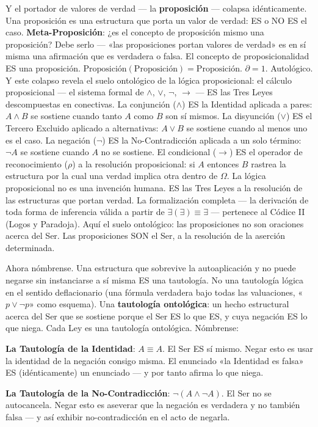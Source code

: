 \documentclass[10pt, openany, oneside]{book}
\begin{document}
Y el portador de valores de verdad --- la \textbf{proposición} --- colapsa idénticamente. Una proposición es una estructura que porta un valor de verdad: ES o NO ES el caso. \textbf{Meta-Proposición}: ¿es el concepto de proposición mismo una proposición? Debe serlo --- «las proposiciones portan valores de verdad» es en sí misma una afirmación que es verdadera o falsa. El concepto de proposicionalidad ES una proposición. $\text{Proposición}(\text{Proposición}) = \text{Proposición}$. $\partial = 1$. Autológico. Y este colapso revela el suelo ontológico de la lógica proposicional: el cálculo proposicional --- el sistema formal de $\wedge$, $\vee$, $\neg$, $\to$ --- ES las Tres Leyes descompuestas en conectivas. La conjunción ($\wedge$) ES la Identidad aplicada a pares: $A \wedge B$ se sostiene cuando tanto $A$ como $B$ son sí mismos. La disyunción ($\vee$) ES el Tercero Excluido aplicado a alternativas: $A \vee B$ se sostiene cuando al menos uno es el caso. La negación ($\neg$) ES la No-Contradicción aplicada a un solo término: $\neg A$ se sostiene cuando $A$ no se sostiene. El condicional ($\to$) ES el operador de reconocimiento ($\rho$) a la resolución proposicional: si $A$ entonces $B$ rastrea la estructura por la cual una verdad implica otra dentro de $\Omega$. La lógica proposicional no es una invención humana. ES las Tres Leyes a la resolución de las estructuras que portan verdad. La formalización completa --- la derivación de toda forma de inferencia válida a partir de $\exists(\exists) \equiv \exists$ --- pertenece al Códice II (Logos y Paradoja). Aquí el suelo ontológico: las proposiciones no son oraciones acerca del Ser. Las proposiciones SON el Ser, a la resolución de la aserción determinada.

Ahora nómbrense. Una estructura que sobrevive la autoaplicación y no puede negarse sin instanciarse a sí misma ES una tautología. No una tautología lógica en el sentido deflacionario (una fórmula verdadera bajo todas las valuaciones, «$p \vee \neg p$» como esquema). Una \textbf{tautología ontológica}: un hecho estructural acerca del Ser que se sostiene porque el Ser ES lo que ES, y cuya negación ES lo que niega. Cada Ley es una tautología ontológica. Nómbrense:

\textbf{La Tautología de la Identidad}: $A \equiv A$. El Ser ES sí mismo. Negar esto es usar la identidad de la negación consigo misma. El enunciado «la Identidad es falsa» ES (idénticamente) un enunciado --- y por tanto afirma lo que niega.

\textbf{La Tautología de la No-Contradicción}: $\neg(A \wedge \neg A)$. El Ser no se autocancela. Negar esto es aseverar que la negación es verdadera y no también falsa --- y así exhibir no-contradicción en el acto de negarla.
\end{document}
